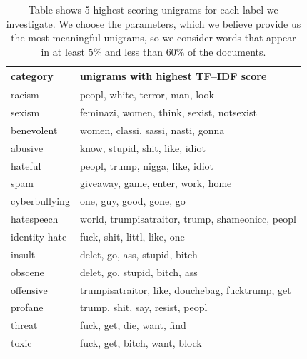 \documentclass[fleqn,moreauthors,10pt]{ds_report}
\begin{document}
\begin{table}[htb]
\scriptsize
\centering
\begin{tabular}{l|l}
\toprule
\textbf{category}   & \textbf{unigrams with highest TF--IDF score} \\ \midrule
racism     & peopl, white, terror, man, look                \\ \hline
sexism     & feminazi, women, think, sexist, notsexist                \\ \hline
benevolent & women, classi, sassi, nasti, gonna            \\ \hline
abusive    & know, stupid, shit, like, idiot  \\ \hline
hateful    & peopl, trump, nigga, like, idiot    \\ \hline
spam       & giveaway, game, enter, work, home            \\ \hline
cyberbullying       & one, guy, good, gone, go             \\ \hline
hatespeech      & world, trumpisatraitor, trump, shameonicc, peopl             \\ \hline
identity hate       & fuck, shit, littl, like, one             \\ \hline
insult       & delet, go, ass, stupid, bitch        \\ \hline
obscene       & delet, go, stupid, bitch, ass             \\ \hline
offensive       & trumpisatraitor, like, douchebag, fucktrump, get            \\ \hline
profane       & trump, shit, say, resist, peopl             \\ \hline
threat       & fuck, get, die, want, find           \\ \hline
toxic       & fuck, get, bitch, want, block             \\ \bottomrule
\end{tabular}
\caption{Table shows 5 highest scoring unigrams for each label we investigate. We choose the parameters, which we believe provide us the most meaningful unigrams, so we consider words that appear in at least $5\%$ and less than $60\%$ of the documents.}
\label{tab:tf-idf}
\end{table}
\end{document}
